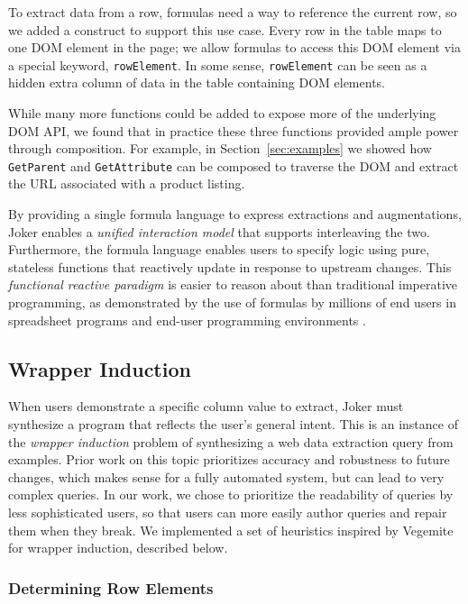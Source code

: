 \documentclass[conference]{IEEEtran}
\begin{document}
To extract data from a row, formulas need a way to reference the current
row, so we added a construct to support this use case. Every row in the
table maps to one DOM element in the page; we allow formulas to access
this DOM element via a special keyword, \texttt{rowElement}. In some
sense, \texttt{rowElement} can be seen as a hidden extra column of data
in the table containing DOM elements.

While many more functions could be added to expose more of the
underlying DOM API, we found that in practice these three functions
provided ample power through composition. For example, in
Section~\ref{sec:examples} we showed how \texttt{GetParent} and
\texttt{GetAttribute} can be composed to traverse the DOM and extract
the URL associated with a product listing.

By providing a single formula language to express extractions and
augmentations, Joker enables a \emph{unified interaction model} that
supports interleaving the two. Furthermore, the formula language enables
users to specify logic using pure, stateless functions that reactively
update in response to upstream changes. This \emph{functional reactive
paradigm} is easier to reason about than traditional imperative
programming, as demonstrated by the use of formulas by millions of end
users in spreadsheet programs and end-user programming environments
\citep{2021g, 2021h, 2021f, 2021a, 2021c, chang2014}.

\hypertarget{wrapper-induction}{%
\subsection{Wrapper Induction}\label{wrapper-induction}}

When users demonstrate a specific column value to extract, Joker must
synthesize a program that reflects the user's general intent. This is an
instance of the \emph{wrapper induction} problem of synthesizing a web
data extraction query from examples. Prior work on this topic
\citep{kushmerick2000, furche2016} prioritizes accuracy and robustness
to future changes, which makes sense for a fully automated system, but
can lead to very complex queries. In our work, we chose to prioritize
the readability of queries by less sophisticated users, so that users
can more easily author queries and repair them when they break. We
implemented a set of heuristics inspired by Vegemite \citep{lin2009} for
wrapper induction, described below.

\hypertarget{determining-row-elements}{%
\subsubsection{Determining Row
Elements}\label{determining-row-elements}}
\end{document}
